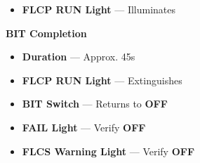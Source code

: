 \begin{checklistenumerate}
{\begin{subenumerate}
        \begin{itemize}
            \item \textbf{FLCP RUN Light} --- Illuminates
        \end{itemize}
        \item \textbf{BIT Completion}
        \begin{itemize}
            \item \textbf{Duration} --- Approx. 45s
            \item \textbf{FLCP RUN Light} --- Extinguishes
            \item \textbf{BIT Switch} --- Returns to \textbf{OFF}
            \item \textbf{FAIL Light} --- Verify \textbf{OFF}
            \item \textbf{FLCS Warning Light} --- Verify \textbf{OFF}
        \end{itemize}
    \end{subenumerate}}
\end{checklistenumerate}

\clearpage

